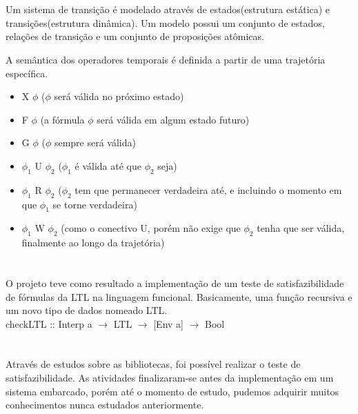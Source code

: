 \documentclass{sciposter}
\newcommand{\tituloA}[1]{\Large{\emph{\textbf{\color{white}{#1}}}}}
\begin{document}
\begin{multicols}{3}
{\section*{\tituloA{Semântica da Lógica Temporal}}

Um sistema de transição é modelado através de estados(estrutura estática) e transições(estrutura dinâmica). Um modelo possui um conjunto de estados, relações de transição e um conjunto de proposições atômicas.
\par A semântica dos operadores temporais é definida a partir de uma trajetória específica.
\begin{itemize}
	\item X $\phi$ ($\phi$ será válida no próximo estado)
	\item F $\phi$ (a fórmula $\phi$ será válida em algum estado futuro)
	\item G $\phi$ ($\phi$ sempre será válida)
	\item $\phi _{1}$ U $\phi _{2}$ ($\phi _{1}$ é válida até que $\phi _{2}$ seja)
	\item $\phi _{1}$ R $\phi _{2}$ ($\phi _{2}$ tem que permanecer verdadeira até, e incluindo o momento em que $\phi _{1}$ se torne verdadeira)
	\item $\phi _{1}$ W $\phi _{2}$ (como o conectivo U, porém não exige que $\phi _{2}$ tenha que ser válida, finalmente ao longo da trajetória) 
\end{itemize}

\section*{\tituloA{Resultados Obtidos}}
O projeto teve como resultado a implementação de um teste de satisfazibilidade de fórmulas da LTL na linguagem funcional. Basicamente, uma função recursiva e um novo tipo de dados nomeado LTL.\\
checkLTL :: Interp a $\rightarrow $ LTL $\rightarrow $ [Env a] $\rightarrow $ Bool	

\section*{\tituloA{Conclusões}}
Através de estudos sobre as bibliotecas, foi possível realizar o teste de satisfazibilidade. As atividades finalizaram-se antes da implementação em um sistema embarcado, porém até o momento de estudo, pudemos adquirir muitos conhecimentos nunca estudados anteriormente.

  \section*{\tituloA{Referências}}
  \renewcommand{\section}[2]{}
  
  

  }\end{multicols}
\end{document}
